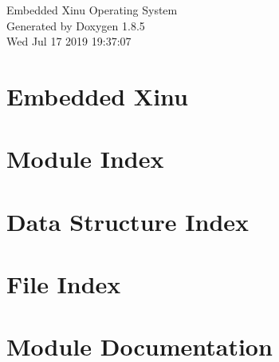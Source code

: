 \documentclass[twoside]{book}
\newcommand{\clearemptydoublepage}{%
  \newpage{\pagestyle{empty}\cleardoublepage}%
}
\begin{document}
\hypersetup{pageanchor=false}
\begin{titlepage}
\vspace*{7cm}
\begin{center}%
{\Large Embedded Xinu Operating System }\\
\vspace*{1cm}
{\large Generated by Doxygen 1.8.5}\\
\vspace*{0.5cm}
{\small Wed Jul 17 2019 19:37:07}\\
\end{center}
\end{titlepage}
\clearemptydoublepage
\tableofcontents
\clearemptydoublepage
{}
\hypersetup{pageanchor=true}

\chapter{Embedded Xinu}
\label{md__users_home_pmcgee6_raxinu_19_ra_xinu_README}
\hypertarget{md__users_home_pmcgee6_raxinu_19_ra_xinu_README}{}

\chapter{Module Index}

\chapter{Data Structure Index}

\chapter{File Index}

\chapter{Module Documentation}







































\end{document}
